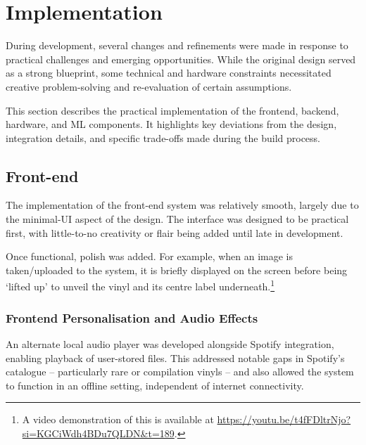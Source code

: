     \section{Implementation}
    
        During development, several changes and refinements were made in response to practical challenges and emerging opportunities. While the original design served as a strong blueprint, some technical and hardware constraints necessitated creative problem-solving and re-evaluation of certain assumptions.
    
        This section describes the practical implementation of the frontend, backend, hardware, and ML components. It highlights key deviations from the design, integration details, and specific trade-offs made during the build process.
    
        \subsection{Front-end}
    
    
            The implementation of the front-end system was relatively smooth, largely due to the minimal-UI aspect of the design. The interface was designed to be practical first, with little-to-no creativity or flair being added until late in development.
    
            Once functional, polish was added. For example, when an image is taken/uploaded to the system, it is briefly displayed on the screen before being `lifted up' to unveil the vinyl and its centre label underneath.\footnote{A video demonstration of this is available at \url{https://youtu.be/t4fFDltrNjo?si=KGCiWdh4BDu7QLDN&t=189}.}
    
            \subsubsection{Frontend Personalisation and Audio Effects}
    
            An alternate local audio player was developed alongside Spotify integration, enabling playback of user-stored files. This addressed notable gaps in Spotify's catalogue -- particularly rare or compilation vinyls -- and also allowed the system to function in an offline setting, independent of internet connectivity.
    
